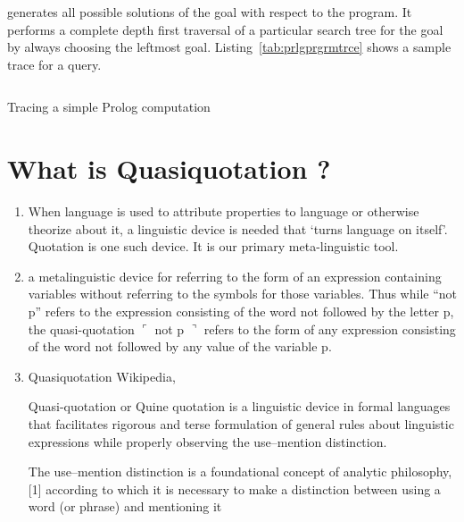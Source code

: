 \documentclass[proposal.tex]{subfiles}
\begin{document}
 generates all possible solutions of the goal with respect to the  program. It performs a complete
depth first traversal of a particular search tree for the goal by always choosing the leftmost goal. Listing~\ref{tab:prlgprgrmtrce} shows
a sample trace for a query.

\begin{code-list}[H]
  \begin{singlespace}
    \inputminted[linenos]{prolog}{prologprogramtrace.pl}
  \end{singlespace}
  \caption{Tracing a simple Prolog computation \cite{Sterling:1994:APA:175753}}
\label{tab:prlgprgrmtrce}
\end{code-list}


\section{What is Quasiquotation ?}
\begin{enumerate}
\item \cite{website:quotationstanford}

When language is used to attribute properties to language or otherwise theorize about it, a linguistic device is needed that `turns 
language on itself'. 
Quotation is one such device. It is our primary meta-linguistic tool.

\item \cite{website:quasiquotationfreedictionary}

a metalinguistic device for referring to the form of an expression containing variables without referring to the symbols for those 
variables. Thus while ``not p'' refers to the expression consisting of the word not followed by the letter p, the quasi-quotation \newline
$\ulcorner$ not p $\urcorner$ refers to the form of any expression consisting of the word not followed by any value of the variable p.

\item  Quasiquotation Wikipedia, \cite{wikiquasi}

Quasi-quotation or Quine quotation is a linguistic device in formal languages that facilitates rigorous and terse formulation of general rules about linguistic expressions while properly observing the use--mention distinction.

\cite{website:usementiondistinctionwiki}
The use--mention distinction is a foundational concept of analytic philosophy,[1] according to which it is necessary to make a distinction 
between using a word (or phrase) and mentioning it


\end{enumerate}
\end{document}
